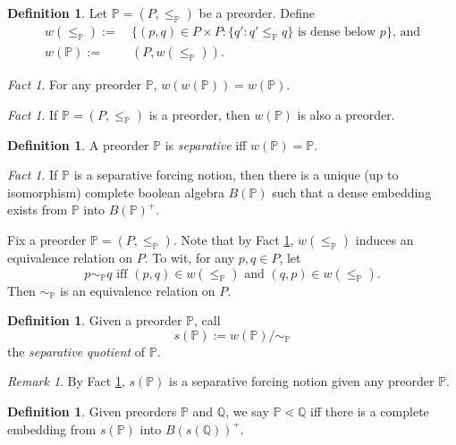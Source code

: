 \documentclass[12pt, twoside]{memoir}
\numberwithin{equation}{section}
\theoremstyle{definition}
\newtheorem{defi}[thm]{Definition}
\theoremstyle{remark}
\newtheorem{rem}[thm]{Remark}
\newtheorem{fact}[thm]{Fact}
\theoremstyle{definition}
\theoremstyle{definition}
\theoremstyle{definition}
\theoremstyle{remark}
\begin{document}
\begin{defi}
Let $\mathbb{P} = (P, \leq_{\mathbb{P}})$ be a preorder. Define \begin{align*}
    w(\leq_{\mathbb{P}}) := \ & \{(p, q) \in P \times P : \{q' : q' \leq_{\mathbb{P}} q\} \text{ is dense below } p\} \text{, and} \\
    w(\mathbb{P}) := \ & (P, w(\leq_{\mathbb{P}})) \text{.}
\end{align*}
\end{defi}

\begin{fact}\label{wfixedp}
For any preorder $\mathbb{P}$, $w(w(\mathbb{P})) = w(\mathbb{P})$.
\end{fact}

\begin{fact}\label{seppre}
If $\mathbb{P} = (P, \leq_{\mathbb{P}})$ is a preorder, then $w(\mathbb{P})$ is also a preorder.
\end{fact}

\begin{defi}
A preorder $\mathbb{P}$ is \emph{separative} iff $w(\mathbb{P}) = \mathbb{P}$.
\end{defi}

\begin{fact}\label{bcompletion}
If $\mathbb{P}$ is a separative forcing notion, then there is a unique (up to isomorphism) complete boolean algebra $B(\mathbb{P})$ such that a dense embedding exists from $\mathbb{P}$ into $B(\mathbb{P})^+$.
\end{fact}

Fix a preorder $\mathbb{P} = (P, \leq_{\mathbb{P}})$. Note that by Fact \ref{seppre}, $w(\leq_{\mathbb{P}})$ induces an equivalence relation on $P$. To wit, for any $p, q \in P$, let $$p \sim_{\mathbb{P}} q \text{ iff } (p, q) \in w(\leq_{\mathbb{P}}) \text{ and } (q, p) \in w(\leq_{\mathbb{P}}) \text{.}$$ Then $\sim_{\mathbb{P}}$ is an equivalence relation on $P$. 

\begin{defi}
Given a preorder $\mathbb{P}$, call $$s(\mathbb{P}) := w(\mathbb{P}) / \sim_{\mathbb{P}}$$ the \emph{separative quotient} of $\mathbb{P}$.
\end{defi}

\begin{rem}
By Fact \ref{wfixedp}, $s(\mathbb{P})$ is a separative forcing notion given any preorder $\mathbb{P}$.
\end{rem}

\begin{defi}
Given preorders $\mathbb{P}$ and $\mathbb{Q}$, we say $\mathbb{P} \lessdot \mathbb{Q}$ iff there is a complete embedding from $s(\mathbb{P})$ into $B(s(\mathbb{Q}))^+$.
\end{defi}
\end{document}
